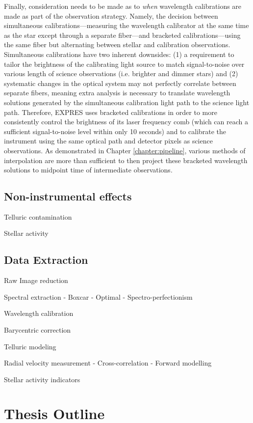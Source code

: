 Finally, consideration needs to be made as to \textit{when} wavelength calibrations are made as part of the observation strategy. Namely, the decision between simultaneous calibrations---measuring the wavelength calibrator at the same time as the star except through a separate fiber---and bracketed calibrations---using the same fiber but alternating between stellar and calibration observations. Simultaneous calibrations have two inherent downsides: (1) a requirement to tailor the brightness of the calibrating light source to match signal-to-noise over various length of science observations (i.e. brighter and dimmer stars) and (2) systematic changes in the optical system may not perfectly correlate between separate fibers, meaning extra analysis is necessary to translate wavelength solutions generated by the simultaneous calibration light path to the science light path. Therefore, EXPRES uses bracketed calibrations in order to more consistently control the brightness of its laser frequency comb (which can reach a sufficient signal-to-noise level within only 10 seconds) and to calibrate the instrument using the same optical path and detector pixels as science observations. As demonstrated in Chapter \ref{chapter:pipeline}, various methods of interpolation are more than sufficient to then project these bracketed wavelength solutions to midpoint time of intermediate observations.

\subsection{Non-instrumental effects}

Telluric contamination

Stellar activity

\subsection{Data Extraction} \label{intro:extraction}

Raw Image reduction

Spectral extraction
- Boxcar
- Optimal
- Spectro-perfectionism

Wavelength calibration

Barycentric correction

Telluric modeling

Radial velocity measurement
- Cross-correlation
- Forward modelling

Stellar activity indicators

\section{Thesis Outline} \label{intro:structure}

